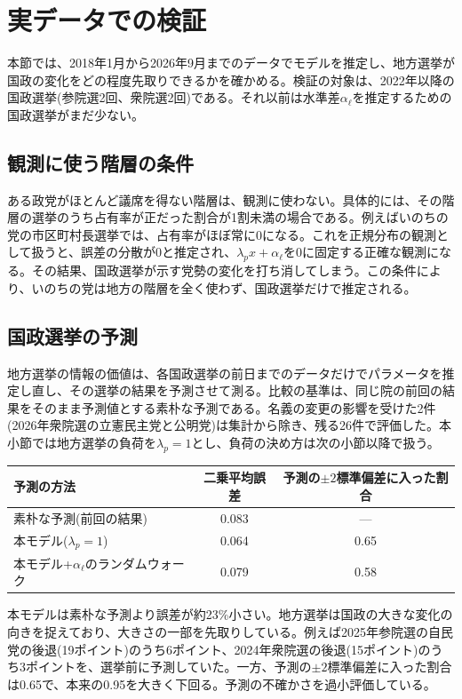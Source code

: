 \documentclass[a4paper,11pt]{ltjsarticle}
\begin{document}
\section{実データでの検証}
\label{sec:results}

本節では、2018年1月から2026年9月までのデータでモデルを推定し、地方選挙が国政の変化をどの程度先取りできるかを確かめる。検証の対象は、2022年以降の国政選挙(参院選2回、衆院選2回)である。それ以前は水準差$\alpha_\ell$を推定するための国政選挙がまだ少ない。

\subsection{観測に使う階層の条件}

ある政党がほとんど議席を得ない階層は、観測に使わない。具体的には、その階層の選挙のうち占有率が正だった割合が1割未満の場合である。例えばいのちの党の市区町村長選挙では、占有率がほぼ常に0になる。これを正規分布の観測として扱うと、誤差の分散が0と推定され、$\lambda_px+\alpha_\ell$を0に固定する正確な観測になる。その結果、国政選挙が示す党勢の変化を打ち消してしまう。この条件により、いのちの党は地方の階層を全く使わず、国政選挙だけで推定される。

\subsection{国政選挙の予測}
\label{sec:forecast}

地方選挙の情報の価値は、各国政選挙の前日までのデータだけでパラメータを推定し直し、その選挙の結果を予測させて測る。比較の基準は、同じ院の前回の結果をそのまま予測値とする素朴な予測である。名義の変更の影響を受けた2件(2026年衆院選の立憲民主党と公明党)は集計から除き、残る26件で評価した。本小節では地方選挙の負荷を$\lambda_p=1$とし、負荷の決め方は次の小節以降で扱う。

\begin{table}[h]
\centering
\begin{tabular}{lcc}
\hline
予測の方法 & 二乗平均誤差 & 予測の$\pm2$標準偏差に入った割合 \\
\hline
素朴な予測(前回の結果) & 0.083 & --- \\
本モデル($\lambda_p=1$) & 0.064 & 0.65 \\
本モデル+$\alpha_\ell$のランダムウォーク & 0.079 & 0.58 \\
\hline
\end{tabular}
\end{table}

本モデルは素朴な予測より誤差が約23\%小さい。地方選挙は国政の大きな変化の向きを捉えており、大きさの一部を先取りしている。例えば2025年参院選の自民党の後退(19ポイント)のうち6ポイント、2024年衆院選の後退(15ポイント)のうち3ポイントを、選挙前に予測していた。一方、予測の$\pm2$標準偏差に入った割合は0.65で、本来の0.95を大きく下回る。予測の不確かさを過小評価している。
\end{document}
